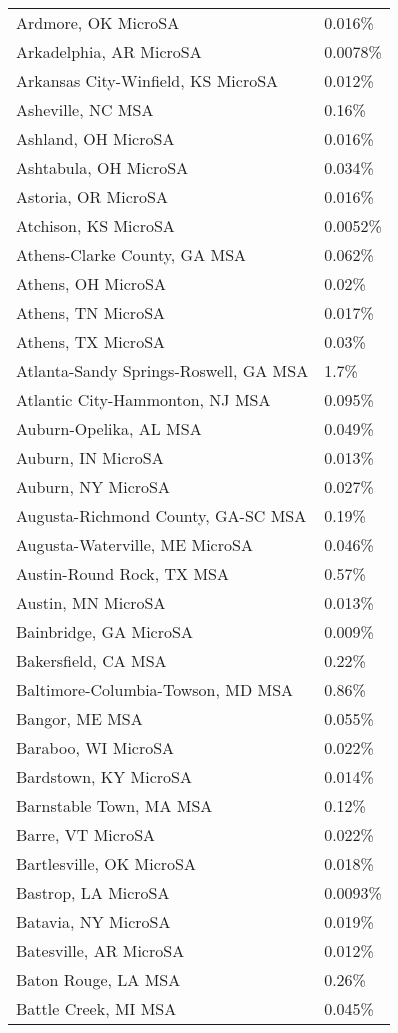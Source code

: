 \begin{longtable}[]{@{}ll@{}}
Ardmore, OK MicroSA & 0.016\% \\
Arkadelphia, AR MicroSA & 0.0078\% \\
Arkansas City-Winfield, KS MicroSA & 0.012\% \\
Asheville, NC MSA & 0.16\% \\
Ashland, OH MicroSA & 0.016\% \\
Ashtabula, OH MicroSA & 0.034\% \\
Astoria, OR MicroSA & 0.016\% \\
Atchison, KS MicroSA & 0.0052\% \\
Athens-Clarke County, GA MSA & 0.062\% \\
Athens, OH MicroSA & 0.02\% \\
Athens, TN MicroSA & 0.017\% \\
Athens, TX MicroSA & 0.03\% \\
Atlanta-Sandy Springs-Roswell, GA MSA & 1.7\% \\
Atlantic City-Hammonton, NJ MSA & 0.095\% \\
Auburn-Opelika, AL MSA & 0.049\% \\
Auburn, IN MicroSA & 0.013\% \\
Auburn, NY MicroSA & 0.027\% \\
Augusta-Richmond County, GA-SC MSA & 0.19\% \\
Augusta-Waterville, ME MicroSA & 0.046\% \\
Austin-Round Rock, TX MSA & 0.57\% \\
Austin, MN MicroSA & 0.013\% \\
Bainbridge, GA MicroSA & 0.009\% \\
Bakersfield, CA MSA & 0.22\% \\
Baltimore-Columbia-Towson, MD MSA & 0.86\% \\
Bangor, ME MSA & 0.055\% \\
Baraboo, WI MicroSA & 0.022\% \\
Bardstown, KY MicroSA & 0.014\% \\
Barnstable Town, MA MSA & 0.12\% \\
Barre, VT MicroSA & 0.022\% \\
Bartlesville, OK MicroSA & 0.018\% \\
Bastrop, LA MicroSA & 0.0093\% \\
Batavia, NY MicroSA & 0.019\% \\
Batesville, AR MicroSA & 0.012\% \\
Baton Rouge, LA MSA & 0.26\% \\
Battle Creek, MI MSA & 0.045\% \\

\end{longtable}

